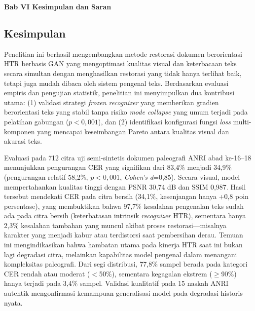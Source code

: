 
\vspace{2cm}
\begin{center}
  {\fontsize{14}{16.8}\selectfont\textbf{Bab VI \quad Kesimpulan dan Saran}}
\end{center}
\label{sec:kesimpulan-dan-saran}
\setcounter{section}{6}
\setcounter{subsection}{0}
\setcounter{table}{0}
\setcounter{figure}{0}
\subsection{Kesimpulan}
\label{subsec:kesimpulan}


Penelitian ini berhasil mengembangkan metode restorasi dokumen berorientasi HTR berbasis GAN yang mengoptimasi kualitas visual dan keterbacaan teks secara simultan dengan menghasilkan restorasi yang tidak hanya terlihat baik, tetapi juga mudah dibaca oleh sistem pengenal teks. Berdasarkan evaluasi empiris dan pengujian statistik, penelitian ini menyimpulkan dua kontribusi utama: (1) validasi strategi \textit{frozen recognizer} yang memberikan gradien berorientasi teks yang stabil tanpa risiko \textit{mode collapse} yang umum terjadi pada pelatihan gabungan ($p<0,001$), dan (2) identifikasi konfigurasi fungsi \textit{loss} multi-komponen yang mencapai keseimbangan Pareto antara kualitas visual dan akurasi teks.



Evaluasi pada 712 citra uji semi-sintetis dokumen paleografi ANRI abad ke-16--18 menunjukkan pengurangan CER yang signifikan dari 83,4\% menjadi 34,9\% (pengurangan relatif 58,2\%, $p<0,001$, \textit{Cohen's d}=0,85). Secara visual, model mempertahankan kualitas tinggi dengan PSNR 30,74 dB dan SSIM 0,987. Hasil tersebut mendekati CER pada citra bersih (34,1\%, kesenjangan hanya +0,8 poin persentase), yang membuktikan bahwa 97,7\% kesalahan pengenalan teks sudah ada pada citra bersih (keterbatasan intrinsik \textit{recognizer} HTR), sementara hanya 2,3\% kesalahan tambahan yang muncul akibat proses restorasi---misalnya karakter yang menjadi kabur atau terdistorsi saat pembersihan derau. Temuan ini mengindikasikan bahwa hambatan utama pada kinerja HTR saat ini bukan lagi degradasi citra, melainkan kapabilitas model pengenal dalam menangani kompleksitas paleografi. Dari segi distribusi, 77,8\% sampel berada pada kategori CER rendah atau moderat ($<$50\%), sementara kegagalan ekstrem ($\geq$90\%) hanya terjadi pada 3,4\% sampel. Validasi kualitatif pada 15 naskah ANRI autentik mengonfirmasi kemampuan generalisasi model pada degradasi historis nyata.



